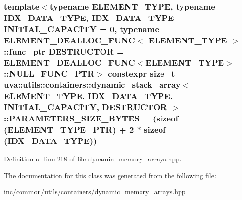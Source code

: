 \subsubsection[{P\+A\+R\+A\+M\+E\+T\+E\+R\+S\+\_\+\+S\+I\+Z\+E\+\_\+\+B\+Y\+T\+E\+S}]{\setlength{\rightskip}{0pt plus 5cm}template$<$typename E\+L\+E\+M\+E\+N\+T\+\_\+\+T\+Y\+P\+E, typename I\+D\+X\+\_\+\+D\+A\+T\+A\+\_\+\+T\+Y\+P\+E, I\+D\+X\+\_\+\+D\+A\+T\+A\+\_\+\+T\+Y\+P\+E I\+N\+I\+T\+I\+A\+L\+\_\+\+C\+A\+P\+A\+C\+I\+T\+Y = 0, typename E\+L\+E\+M\+E\+N\+T\+\_\+\+D\+E\+A\+L\+L\+O\+C\+\_\+\+F\+U\+N\+C$<$ E\+L\+E\+M\+E\+N\+T\+\_\+\+T\+Y\+P\+E $>$\+::func\+\_\+ptr D\+E\+S\+T\+R\+U\+C\+T\+O\+R = E\+L\+E\+M\+E\+N\+T\+\_\+\+D\+E\+A\+L\+L\+O\+C\+\_\+\+F\+U\+N\+C$<$\+E\+L\+E\+M\+E\+N\+T\+\_\+\+T\+Y\+P\+E$>$\+::\+N\+U\+L\+L\+\_\+\+F\+U\+N\+C\+\_\+\+P\+T\+R$>$ constexpr size\+\_\+t {\bf uva\+::utils\+::containers\+::dynamic\+\_\+stack\+\_\+array}$<$ E\+L\+E\+M\+E\+N\+T\+\_\+\+T\+Y\+P\+E, I\+D\+X\+\_\+\+D\+A\+T\+A\+\_\+\+T\+Y\+P\+E, I\+N\+I\+T\+I\+A\+L\+\_\+\+C\+A\+P\+A\+C\+I\+T\+Y, D\+E\+S\+T\+R\+U\+C\+T\+O\+R $>$\+::P\+A\+R\+A\+M\+E\+T\+E\+R\+S\+\_\+\+S\+I\+Z\+E\+\_\+\+B\+Y\+T\+E\+S = (sizeof ({\bf E\+L\+E\+M\+E\+N\+T\+\_\+\+T\+Y\+P\+E\+\_\+\+P\+T\+R}) + 2 $\ast$ sizeof (I\+D\+X\+\_\+\+D\+A\+T\+A\+\_\+\+T\+Y\+P\+E))\hspace{0.3cm}{\ttfamily [static]}}\label{classuva_1_1utils_1_1containers_1_1dynamic__stack__array_a347effea92930daddfb9ba492dedd03a}


Definition at line 218 of file dynamic\+\_\+memory\+\_\+arrays.\+hpp.



The documentation for this class was generated from the following file\+:\begin{DoxyCompactItemize}
\item 
inc/common/utils/containers/\hyperlink{dynamic__memory__arrays_8hpp}{dynamic\+\_\+memory\+\_\+arrays.\+hpp}\end{DoxyCompactItemize}
